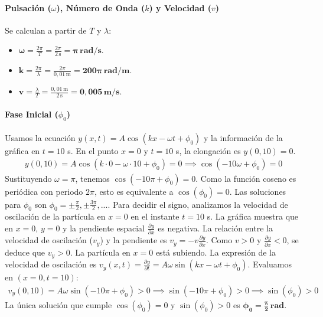 \paragraph*{Pulsación ($\omega$), Número de Onda ($k$) y Velocidad ($v$)}
Se calculan a partir de $T$ y $\lambda$:
\begin{itemize}
    \item $\boldsymbol{\omega} = \frac{2\pi}{T} = \frac{2\pi}{2 \, \text{s}} = \boldsymbol{\pi \, \text{rad/s}}$.
    \item $\boldsymbol{k} = \frac{2\pi}{\lambda} = \frac{2\pi}{0,01 \, \text{m}} = \boldsymbol{200\pi \, \text{rad/m}}$.
    \item $\boldsymbol{v} = \frac{\lambda}{T} = \frac{0,01 \, \text{m}}{2 \, \text{s}} = \boldsymbol{0,005 \, \text{m/s}}$.
\end{itemize}

\paragraph*{Fase Inicial ($\phi_0$)}
Usamos la ecuación $y(x,t) = A \cos(kx - \omega t + \phi_0)$ y la información de la gráfica en $t=10$ s.
En el punto $x=0$ y $t=10$ s, la elongación es $y(0,10)=0$.
\begin{gather}
    y(0,10) = A \cos(k \cdot 0 - \omega \cdot 10 + \phi_0) = 0 \implies \cos(-10\omega + \phi_0) = 0
\end{gather}
Sustituyendo $\omega=\pi$, tenemos $\cos(-10\pi + \phi_0) = 0$. Como la función coseno es periódica con periodo $2\pi$, esto es equivalente a $\cos(\phi_0) = 0$.
Las soluciones para $\phi_0$ son $\phi_0 = \pm \frac{\pi}{2}, \pm \frac{3\pi}{2}, ...$.
Para decidir el signo, analizamos la velocidad de oscilación de la partícula en $x=0$ en el instante $t=10$ s. La gráfica muestra que en $x=0$, $y=0$ y la pendiente espacial $\frac{\partial y}{\partial x}$ es negativa. La relación entre la velocidad de oscilación ($v_y$) y la pendiente es $v_y = -v \frac{\partial y}{\partial x}$. Como $v>0$ y $\frac{\partial y}{\partial x}<0$, se deduce que $v_y > 0$. La partícula en $x=0$ está subiendo.
La expresión de la velocidad de oscilación es $v_y(x,t) = \frac{\partial y}{\partial t} = A\omega \sin(kx - \omega t + \phi_0)$.
Evaluamos en $(x=0, t=10)$:
\begin{gather}
    v_y(0,10) = A\omega \sin(-10\pi + \phi_0) > 0 \implies \sin(-10\pi+\phi_0) > 0 \implies \sin(\phi_0) > 0
\end{gather}
La única solución que cumple $\cos(\phi_0)=0$ y $\sin(\phi_0)>0$ es $\boldsymbol{\phi_0 = \frac{\pi}{2} \, \text{rad}}$.

